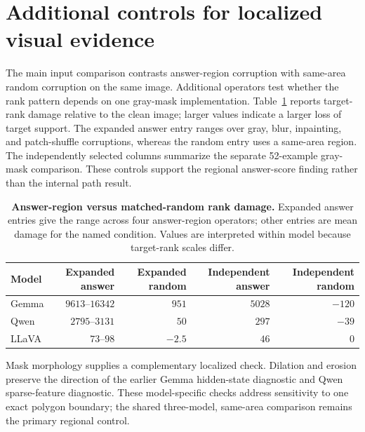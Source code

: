 \section{Additional controls for localized visual evidence}
\label{app:regional-controls}

The main input comparison contrasts answer-region corruption with same-area random corruption on the same image. Additional operators test whether the rank pattern depends on one gray-mask implementation. Table~\ref{tab:stronger-mask-controls} reports target-rank damage relative to the clean image; larger values indicate a larger loss of target support. The expanded answer entry ranges over gray, blur, inpainting, and patch-shuffle corruptions, whereas the random entry uses a same-area region. The independently selected columns summarize the separate 52-example gray-mask comparison. These controls support the regional answer-score finding rather than the internal path result.

\begin{table}[htbp]
\centering
\normalsize
\caption{\textbf{Answer-region versus matched-random rank damage.} Expanded answer entries give the range across four answer-region operators; other entries are mean damage for the named condition. Values are interpreted within model because target-rank scales differ.}
\label{tab:stronger-mask-controls}
\begin{tabular*}{\linewidth}{@{\extracolsep{\fill}}lrrrr@{}}
\toprule
Model & Expanded answer & Expanded random & Independent answer & Independent random \\
\midrule
Gemma & $9613$--$16342$ & $951$ & $5028$ & $-120$ \\
Qwen & $2795$--$3131$ & $50$ & $297$ & $-39$ \\
LLaVA & $73$--$98$ & $-2.5$ & $46$ & $0$ \\
\bottomrule
\end{tabular*}
\end{table}

Mask morphology supplies a complementary localized check. Dilation and erosion preserve the direction of the earlier Gemma hidden-state diagnostic and Qwen sparse-feature diagnostic. These model-specific checks address sensitivity to one exact polygon boundary; the shared three-model, same-area comparison remains the primary regional control.
